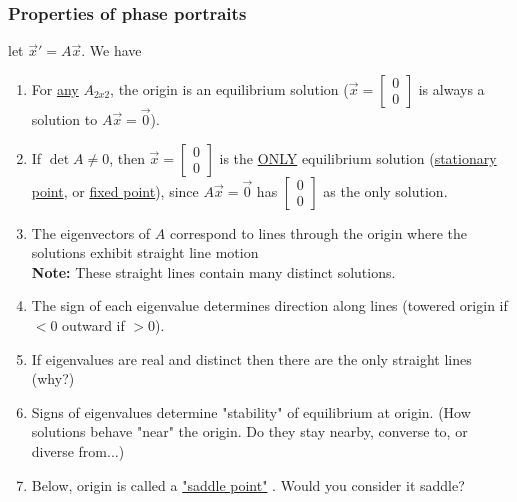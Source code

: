 \subsubsection*{Properties of phase portraits}
let $\vec{x}' = A\vec{x}$. We have
\begin{enumerate}[label=\protect\circled{\arabic*}]
	\item For \underline{any} $A_{2x2}$, the origin is an equilibrium solution ($\vec{x} = \begin{bmatrix}
		0\\0
	\end{bmatrix}$ is always a solution to $A\vec{x} = \vec{0}$).
	\item If $\det A \neq 0$, then $\vec{x} = \begin{bmatrix}
		0\\0
	\end{bmatrix}$ is the \underline{ONLY} equilibrium solution (\underline{stationary point}, or \underline{fixed point}), since $A\vec{x} = \vec{0}$ has $\begin{bmatrix}
		0\\0
	\end{bmatrix}$ as the only solution.
	\item The eigenvectors of $A$ correspond to lines through the origin where the solutions exhibit straight line motion\\
	\textbf{Note: } These straight lines contain many distinct solutions.
	\item The sign of each eigenvalue determines direction along lines (towered origin if $<0$ outward if $>0$).
	\item If eigenvalues are real and distinct then there are the only straight lines (why?)
	\item Signs of eigenvalues determine "stability" of equilibrium at origin. (How solutions behave "near" the origin. Do they stay nearby, converse to, or diverse from...)
	\item Below, origin is called a \underline{"saddle point"} . Would you consider it saddle?
\end{enumerate}
